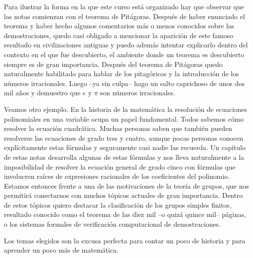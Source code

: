 Para ilustrar la forma en la que este curso está organizado hay que observar
que las notas comienzan con el teorema de Pitágoras. Después de haber enunciado
el teorema y haber hecho algunos comentarios más o menos conocidos sobre las
demostraciones, quedo casi obligado a mencionar la aparición de este famoso
resultado en civilizaciones antiguas y puedo además intentar explicarlo dentro
del contexto en el que fue descubierto, el ambiente donde un teorema
es descubierto siempre es de gran importancia. Después del
teorema de Pitágoras quedo naturalmente habilitado para hablar de los
pitagóricos y la introducción de los números irracionales. Luego --ya sin culpa-- 
hago un salto caprichoso de unos dos mil años y demuestro que $e$ y $\pi$ son
números irracionales.

Veamos otro ejemplo. En la historia de la matemática la resolución de
ecuaciones polinomiales en una variable ocupa un papel fundamental. Todos
sabemos cómo resolver la ecuación cuadrática. Muchas personas saben que también pueden
resolverse las ecuaciones de grado tres y cuatro, aunque pocas personas conocen explícitamente 
estas fórmulas y seguramente casi nadie las recuerda. Un capítulo de estas notas 
desarrolla algunas de estas fórmulas y nos
lleva naturalmente a la imposibilidad de resolver la ecuación general de grado
cinco con fórmulas que involucren raíces de expresiones racionales de los
coeficientes del polinomio. Estamos entonces frente a una de las motivaciones
de la teoría de grupos, que nos permitirá conectarnos con muchos tópicos
actuales de gran importancia. Dentro de estos tópicos quiero destacar la
clasificación de los grupos simples finitos, resultado conocido como el teorema
de las diez mil --o quizá quince mil-- páginas, o los sistemas formales de 
verificación computacional de demostraciones. 

Los temas elegidos son la excusa perfecta para contar un poco de historia y
para aprender un poco más de matemática. 

